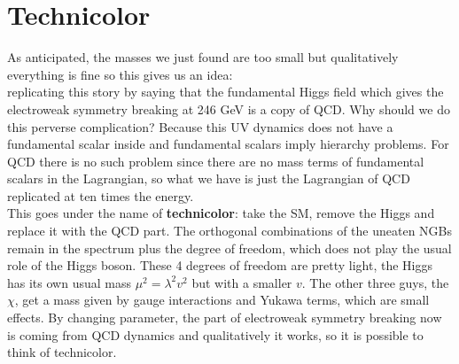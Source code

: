 \documentclass[../main.tex]{subfiles}
\begin{document}
\section{Technicolor}
As anticipated, the masses we just found are too small but qualitatively everything is fine so this gives us an idea: \\ replicating this story by saying that the fundamental Higgs field which gives the electroweak symmetry breaking at 246 GeV is a copy of QCD. Why should we do this perverse complication? Because this UV dynamics does not have a fundamental scalar inside and fundamental scalars imply hierarchy problems.
For QCD there is no such problem since there are no mass terms of fundamental scalars in the Lagrangian, so what we have is just the Lagrangian of QCD replicated at ten times the energy.\\
This goes under the name of \textbf{technicolor}: take the SM, remove the Higgs and replace it with the QCD part. The orthogonal combinations of the uneaten NGBs remain in the spectrum plus the  degree of freedom, which does not play the usual role of the Higgs boson. These 4 degrees of freedom are pretty light, the Higgs has its own usual mass $\mu^2=\lambda^2v^2$ but with a smaller $v$. The other three guys, the $\chi$, get a mass given by gauge interactions and Yukawa terms, which are small effects. By changing parameter, the part of electroweak symmetry breaking now is coming from QCD dynamics and qualitatively it works, so it is possible to think of technicolor.\\
\end{document}
